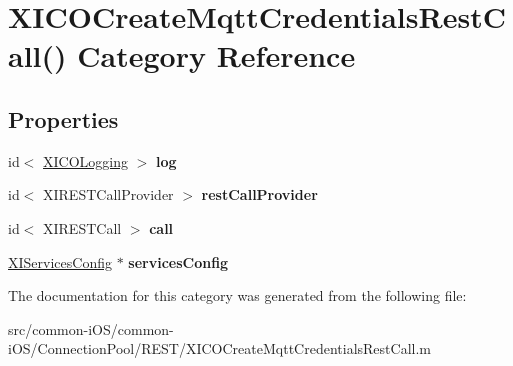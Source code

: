 \hypertarget{category_x_i_c_o_create_mqtt_credentials_rest_call_07_08}{}\section{X\+I\+C\+O\+Create\+Mqtt\+Credentials\+Rest\+Call() Category Reference}
\label{category_x_i_c_o_create_mqtt_credentials_rest_call_07_08}
\subsection*{Properties}
\begin{DoxyCompactItemize}
\item 
\hypertarget{category_x_i_c_o_create_mqtt_credentials_rest_call_07_08_aff8921175aa5a33b20cf6b8ccafce771}{}\label{category_x_i_c_o_create_mqtt_credentials_rest_call_07_08_aff8921175aa5a33b20cf6b8ccafce771} 
id$<$ \hyperlink{protocol_x_i_c_o_logging-p}{X\+I\+C\+O\+Logging} $>$ {\bfseries log}
\item 
\hypertarget{category_x_i_c_o_create_mqtt_credentials_rest_call_07_08_a6f658c3d1382683cc8131ca48988c4ba}{}\label{category_x_i_c_o_create_mqtt_credentials_rest_call_07_08_a6f658c3d1382683cc8131ca48988c4ba} 
id$<$ X\+I\+R\+E\+S\+T\+Call\+Provider $>$ {\bfseries rest\+Call\+Provider}
\item 
\hypertarget{category_x_i_c_o_create_mqtt_credentials_rest_call_07_08_ae829cae2c8f1ea3f530f8e9640878e9b}{}\label{category_x_i_c_o_create_mqtt_credentials_rest_call_07_08_ae829cae2c8f1ea3f530f8e9640878e9b} 
id$<$ X\+I\+R\+E\+S\+T\+Call $>$ {\bfseries call}
\item 
\hypertarget{category_x_i_c_o_create_mqtt_credentials_rest_call_07_08_af7788be9e4a0c69bde5f8f5893d1f069}{}\label{category_x_i_c_o_create_mqtt_credentials_rest_call_07_08_af7788be9e4a0c69bde5f8f5893d1f069} 
\hyperlink{interface_x_i_services_config}{X\+I\+Services\+Config} $\ast$ {\bfseries services\+Config}
\end{DoxyCompactItemize}


The documentation for this category was generated from the following file\+:\begin{DoxyCompactItemize}
\item 
src/common-\/i\+O\+S/common-\/i\+O\+S/\+Connection\+Pool/\+R\+E\+S\+T/X\+I\+C\+O\+Create\+Mqtt\+Credentials\+Rest\+Call.\+m\end{DoxyCompactItemize}
